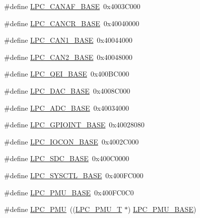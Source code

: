 \begin{DoxyCompactItemize}
\item 
\#define \hyperlink{group__PERIPH__177X__8X__BASE_gabc6943f9e943d63ecf4e236b4ce7c344}{L\-P\-C\-\_\-\-C\-A\-N\-A\-F\-\_\-\-B\-A\-S\-E}~0x4003\-C000
\item 
\#define \hyperlink{group__PERIPH__177X__8X__BASE_gac22b88e108d620661add143c174f8f11}{L\-P\-C\-\_\-\-C\-A\-N\-C\-R\-\_\-\-B\-A\-S\-E}~0x40040000
\item 
\#define \hyperlink{group__PERIPH__177X__8X__BASE_gaf2407c1927ebddd767832aefa74c3398}{L\-P\-C\-\_\-\-C\-A\-N1\-\_\-\-B\-A\-S\-E}~0x40044000
\item 
\#define \hyperlink{group__PERIPH__177X__8X__BASE_gab9608b3b72dd843a25910dd2a809106b}{L\-P\-C\-\_\-\-C\-A\-N2\-\_\-\-B\-A\-S\-E}~0x40048000
\item 
\#define \hyperlink{group__PERIPH__177X__8X__BASE_ga80fa25b18324c10c8e5c26893e6f0a67}{L\-P\-C\-\_\-\-Q\-E\-I\-\_\-\-B\-A\-S\-E}~0x400\-B\-C000
\item 
\#define \hyperlink{group__PERIPH__177X__8X__BASE_ga3bbaedad584252212d4704bb419489f6}{L\-P\-C\-\_\-\-D\-A\-C\-\_\-\-B\-A\-S\-E}~0x4008\-C000
\item 
\#define \hyperlink{group__PERIPH__177X__8X__BASE_ga2396e0d0c565e4c1c3b2fc593bd6c37f}{L\-P\-C\-\_\-\-A\-D\-C\-\_\-\-B\-A\-S\-E}~0x40034000
\item 
\#define \hyperlink{group__PERIPH__177X__8X__BASE_gadf88491f4b83b5af99eaf30778cb62fa}{L\-P\-C\-\_\-\-G\-P\-I\-O\-I\-N\-T\-\_\-\-B\-A\-S\-E}~0x40028080
\item 
\#define \hyperlink{group__PERIPH__177X__8X__BASE_gae48aea115d5924805263d7a15402d4fa}{L\-P\-C\-\_\-\-I\-O\-C\-O\-N\-\_\-\-B\-A\-S\-E}~0x4002\-C000
\item 
\#define \hyperlink{group__PERIPH__177X__8X__BASE_gab8f044e5911a6bf51879e4614bf2a0a3}{L\-P\-C\-\_\-\-S\-D\-C\-\_\-\-B\-A\-S\-E}~0x400\-C0000
\item 
\#define \hyperlink{group__PERIPH__177X__8X__BASE_gae4670b50fe27772fa31de1da10bec7b7}{L\-P\-C\-\_\-\-S\-Y\-S\-C\-T\-L\-\_\-\-B\-A\-S\-E}~0x400\-F\-C000
\item 
\#define \hyperlink{group__PERIPH__177X__8X__BASE_ga865bed8ad61e9e273439ad1349a46d68}{L\-P\-C\-\_\-\-P\-M\-U\-\_\-\-B\-A\-S\-E}~0x400\-F\-C0\-C0
\item 
\#define \hyperlink{group__PERIPH__177X__8X__BASE_ga9d540cc313db00679c10f9ac1961b06a}{L\-P\-C\-\_\-\-P\-M\-U}~((\hyperlink{structLPC__PMU__T}{L\-P\-C\-\_\-\-P\-M\-U\-\_\-\-T}              $\ast$) \hyperlink{group__PERIPH__407X__8X__BASE_ga865bed8ad61e9e273439ad1349a46d68}{L\-P\-C\-\_\-\-P\-M\-U\-\_\-\-B\-A\-S\-E})

\end{DoxyCompactItemize}
